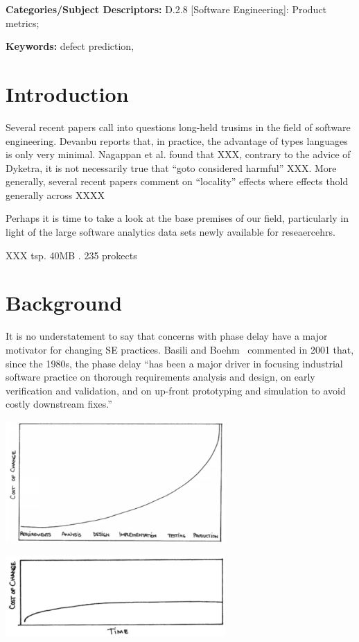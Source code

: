 \documentclass{sig-alternate}
\begin{document}
\vspace{1mm}
\noindent
{\bf Categories/Subject Descriptors:} 
D.2.8 [Software Engineering]: Product metrics; 

 

\vspace{1mm}
\noindent
{\bf Keywords:} defect prediction, 

\section{Introduction}
Several recent papers call into questions long-held trusims in the field
of software engineering. Devanbu reports that, in practice, the advantage of types languages
is only very minimal. Nagappan et al. found that XXX, contrary to the advice of Dyketra,
it is not necessarily true that ``goto considered harmful'' XXX. More generally,
several recent  papers comment on ``locality'' effects where effects
thold  generally across XXXX
 
Perhaps it is time to take a look at the base premises of our field, particularly in light of the large software analytics data sets newly available for reseaercehrs.

XXX tsp. 40MB . 235 prokects

\section{Background}

It is no understatement to say that 
concerns with  phase delay have 
a major  motivator for changing
SE practices. Basili and Boehm~\cite{boehm01}  commented in
2001 that, since the 1980s, the phase delay
``has been a major driver in focusing
industrial software practice on thorough
requirements analysis and design,
on early verification and validation, and
on up-front prototyping and simulation
to avoid costly downstream fixes.''

\begin{center}
\includegraphics[width=3.3in]{beckB4.png}

\includegraphics[width=3.3in]{beckAFTER.png}
\end{center}
\end{document}
